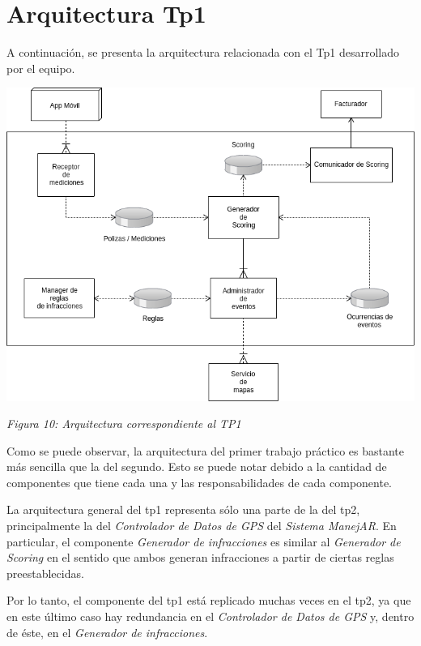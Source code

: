 \section{Arquitectura Tp1}

A continuación, se presenta la arquitectura relacionada con el Tp1 desarrollado por el equipo.

\centerline{\includegraphics[width=1\textwidth]{./imagenes/tp1.png}}
\centerline{\textit{Figura 10: Arquitectura correspondiente al TP1}}


Como se puede observar, la arquitectura del primer trabajo práctico es bastante más sencilla
que la del segundo. Esto se puede notar debido a la cantidad de componentes que tiene cada una y
las responsabilidades de cada componente.


La arquitectura general del tp1 representa sólo una parte de la del tp2, principalmente la del
\textit{Controlador de Datos de GPS} del \textit{Sistema ManejAR}. 
En particular, el componente \textit{Generador de infracciones} es similar al \textit{Generador de Scoring} en el
sentido que ambos generan infracciones a partir de ciertas reglas preestablecidas.


Por lo tanto, el componente del tp1 está replicado muchas veces en el tp2, ya que en este último caso
hay redundancia en el \textit{Controlador de Datos de GPS} y, dentro de éste, en el \textit{Generador de infracciones}.






